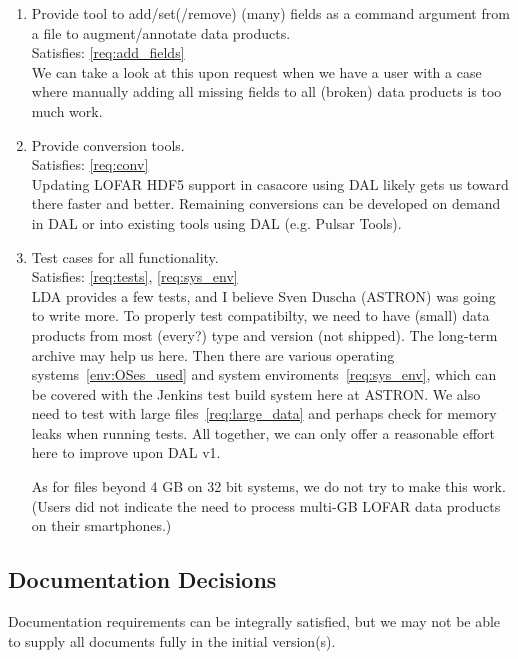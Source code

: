 \documentclass[a4paper,11pt]{article}
\begin{document}
\begin{enumerate}[resume, label=\it D.\arabic{*}]


\item \label{dsg:add_fields} Provide tool to add/set(/remove) (many) fields as a command argument from a file to augment/annotate data products.\\
Satisfies: \ref{req:add_fields}\\
We can take a look at this upon request when we have a user with a case where manually adding all missing fields to all (broken) data products is too much work.

\item \label{dsg:conv} Provide conversion tools.\\
Satisfies: \ref{req:conv}\\
Updating LOFAR HDF5 support in casacore using DAL likely gets us toward there faster and better.
Remaining conversions can be developed on demand in DAL or into existing tools using DAL (e.g. Pulsar Tools).

\item \label{dsg:tests} Test cases for all functionality.\\
Satisfies: \ref{req:tests}, \ref{req:sys_env}\\
LDA provides a few tests, and I believe Sven Duscha (ASTRON) was going to write more.
To properly test compatibilty, we need to have (small) data products from most (every?) type and version (not shipped).
The long-term archive may help us here.
Then there are various operating systems~\ref{env:OSes_used} and system enviroments~\ref{req:sys_env}, which can be covered with the Jenkins test build system here at ASTRON.
We also need to test with large files~\ref{req:large_data} and perhaps check for memory leaks when running tests.
All together, we can only offer a reasonable effort here to improve upon DAL v1.

As for files beyond 4 GB on 32 bit systems, we do not try to make this work.
(Users did not indicate the need to process multi-GB LOFAR data products on their smartphones.)

\end{enumerate}


\subsection{Documentation Decisions} \label{sec:doc_decisions}
Documentation requirements can be integrally satisfied, but we may not be able to supply all documents fully in the initial version(s).
\end{document}
